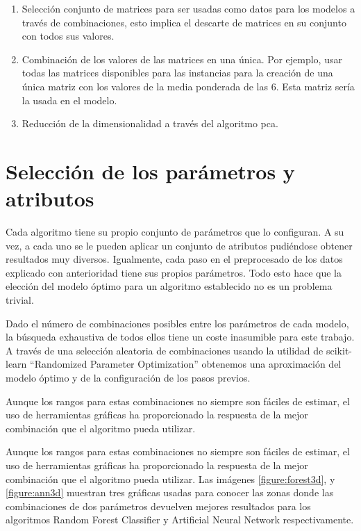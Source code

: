 \begin{enumerate}
    \item Selección conjunto de matrices para ser usadas como datos para los modelos a través de combinaciones, esto implica el descarte de matrices en su conjunto con todos sus valores.
    
    \item Combinación de los valores de las matrices en una única. Por ejemplo, usar todas las matrices disponibles para las instancias para la creación de una única matriz con los valores de la media ponderada de las 6. Esta matriz sería la usada en el modelo.
    
    \item Reducción de la dimensionalidad a través del algoritmo \gls{pca}.
    
\end{enumerate}

\section{Selección de los parámetros y atributos}

Cada algoritmo tiene su propio conjunto de parámetros que lo configuran. A su vez, a cada uno se le pueden aplicar un conjunto de atributos pudiéndose obtener resultados muy diversos. Igualmente, cada paso en el preprocesado de los datos explicado con anterioridad tiene sus propios parámetros. Todo esto hace que la elección del modelo óptimo para un algoritmo establecido no es un problema trivial.

Dado el número de combinaciones posibles entre los parámetros de cada modelo, la búsqueda exhaustiva de todos ellos tiene un coste inasumible para este trabajo. A través de una selección aleatoria de combinaciones usando la utilidad de scikit-learn ``Randomized Parameter Optimization'' obtenemos una aproximación del modelo óptimo y de la configuración de los pasos previos.

Aunque los rangos para estas combinaciones no siempre son fáciles de estimar, el uso de herramientas gráficas ha proporcionado la respuesta de la mejor combinación que el algoritmo pueda utilizar.



Aunque los rangos para estas combinaciones no siempre son fáciles de estimar, el uso de herramientas gráficas ha proporcionado la respuesta de la mejor combinación que el algoritmo pueda utilizar. Las imágenes \ref{figure:forest3d}, y \ref{figure:ann3d} muestran tres gráficas usadas para conocer las zonas donde las combinaciones de dos parámetros devuelven mejores resultados para los algoritmos  Random Forest Classifier y Artificial Neural Network respectivamente.

